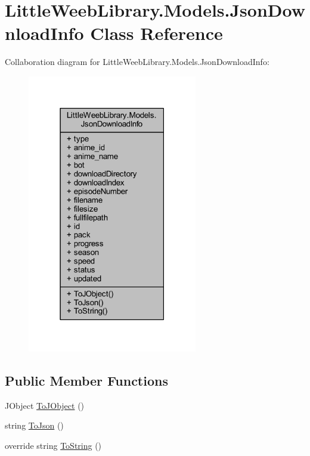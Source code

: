 \hypertarget{class_little_weeb_library_1_1_models_1_1_json_download_info}{}\section{Little\+Weeb\+Library.\+Models.\+Json\+Download\+Info Class Reference}
\label{class_little_weeb_library_1_1_models_1_1_json_download_info}


Collaboration diagram for Little\+Weeb\+Library.\+Models.\+Json\+Download\+Info\+:\nopagebreak
\begin{figure}[H]
\begin{center}
\leavevmode
\includegraphics[width=210pt]{class_little_weeb_library_1_1_models_1_1_json_download_info__coll__graph}
\end{center}
\end{figure}
\subsection*{Public Member Functions}
\begin{DoxyCompactItemize}
\item 
J\+Object \mbox{\hyperlink{class_little_weeb_library_1_1_models_1_1_json_download_info_a9a8921b52b118be5bc135ad49a4aee29}{To\+J\+Object}} ()
\item 
string \mbox{\hyperlink{class_little_weeb_library_1_1_models_1_1_json_download_info_a3fd450e7e2de8b9a936ba3b2cbeeaccb}{To\+Json}} ()
\item 
override string \mbox{\hyperlink{class_little_weeb_library_1_1_models_1_1_json_download_info_af36cbb3251b0efcd80a45f1fef89f5c9}{To\+String}} ()
\end{DoxyCompactItemize}
